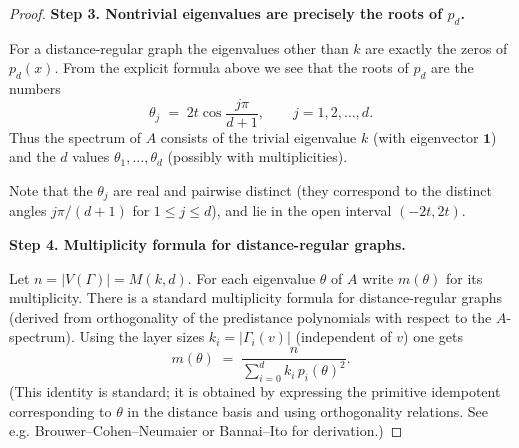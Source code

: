 \documentclass[12pt,a4paper,openany]{book}
\begin{document}
\begin{proof}
\medskip\noindent\textbf{Step 3. Nontrivial eigenvalues are precisely the roots of \(p_d\).}

For a distance-regular graph the eigenvalues other than $k$ are exactly
the zeros of $p_d(x)$. From the explicit formula above we see that the
roots of $p_d$ are the numbers
\[
\theta_j \;=\; 2t\cos\!\frac{j\pi}{d+1},\qquad j=1,2,\dots,d.
\]
Thus the spectrum of $A$ consists of the trivial eigenvalue $k$ (with
eigenvector $\mathbf{1}$) and the $d$ values $\theta_1,\dots,\theta_d$
(possibly with multiplicities).

Note that the $\theta_j$ are real and pairwise distinct (they correspond
to the distinct angles $j\pi/(d+1)$ for $1\le j\le d$), and lie in the
open interval $(-2t,2t)$.

\medskip\noindent\textbf{Step 4. Multiplicity formula for distance-regular graphs.}

Let $n=|V(\Gamma)|=M(k,d)$. For each eigenvalue $\theta$ of $A$ write
$m(\theta)$ for its multiplicity. There is a standard multiplicity
formula for distance-regular graphs (derived from orthogonality of the
predistance polynomials with respect to the $A$-spectrum). Using the
layer sizes $k_i = |\Gamma_i(v)|$ (independent of $v$) one gets
\begin{equation}\label{mult-form}
m(\theta) \;=\; \frac{n}{\sum_{i=0}^d k_i\, p_i(\theta)^2 }.
\end{equation}
(This identity is standard; it is obtained by expressing the primitive
idempotent corresponding to $\theta$ in the distance basis and using
orthogonality relations. See e.g. Brouwer–Cohen–Neumaier or Bannai–Ito
for derivation.)


\end{proof}
\end{document}
